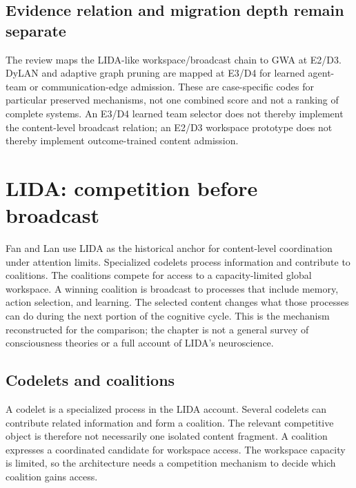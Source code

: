 \subsection{Evidence relation and migration depth remain separate}

The review maps the LIDA-like workspace/broadcast chain to GWA at E2/D3. DyLAN and adaptive graph pruning are mapped at E3/D4 for learned agent-team or communication-edge admission. These are case-specific codes for particular preserved mechanisms, not one combined score and not a ranking of complete systems. An E3/D4 learned team selector does not thereby implement the content-level broadcast relation; an E2/D3 workspace prototype does not thereby implement outcome-trained content admission.

\section{LIDA: competition before broadcast}
\label{sec:ch14-lida}

Fan and Lan use LIDA as the historical anchor for content-level coordination under attention limits. Specialized codelets process information and contribute to coalitions. The coalitions compete for access to a capacity-limited global workspace. A winning coalition is broadcast to processes that include memory, action selection, and learning. The selected content changes what those processes can do during the next portion of the cognitive cycle. This is the mechanism reconstructed for the comparison; the chapter is not a general survey of consciousness theories or a full account of LIDA's neuroscience.\autocite{franklin2012lida}

\subsection{Codelets and coalitions}

A codelet is a specialized process in the LIDA account. Several codelets can contribute related information and form a coalition. The relevant competitive object is therefore not necessarily one isolated content fragment. A coalition expresses a coordinated candidate for workspace access. The workspace capacity is limited, so the architecture needs a competition mechanism to decide which coalition gains access.


